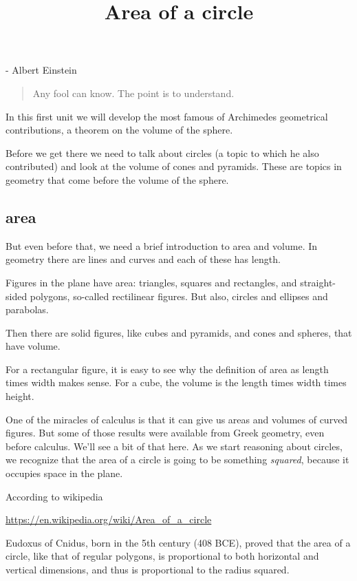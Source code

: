 \documentclass[11pt, oneside]{article}
\title{Area of a circle}
\date{}
\begin{document}
\maketitle
\Large  

- Albert Einstein

\begin{quote}Any fool can know.  The point is to understand.\end{quote}

In this first unit we will develop the most famous of Archimedes geometrical contributions, a theorem on the volume of the sphere.  

Before we get there we need to talk about circles (a topic to which he also contributed) and look at the volume of cones and pyramids.  These are topics in geometry that come  before the volume of the sphere.

\subsection*{area}

But even before that, we need a brief introduction to area and volume.  In geometry there are lines and curves and each of these has length.  

Figures in the plane have area:  triangles, squares and rectangles, and straight-sided polygons, so-called rectilinear figures.  But also, circles and ellipses and parabolas.  

Then there are solid figures, like cubes and pyramids, and cones and spheres, that have volume.

For a rectangular figure, it is easy to see why the definition of area as length times  width makes sense.  For a cube, the volume is the length times width times height.  

One of the miracles of calculus is that it can give us areas and volumes of curved figures.  But some of those results were available from Greek geometry, even before calculus.  We'll see a bit of that here.  As we start reasoning about circles, we recognize that the area of a circle is going to be something \emph{squared}, because it occupies space in the plane.

According to wikipedia

\url{https://en.wikipedia.org/wiki/Area_of_a_circle}

Eudoxus of Cnidus, born in the 5th century (408 BCE), proved that the area of a circle, like that of regular polygons, is proportional to both horizontal and vertical dimensions, and thus is proportional to the radius squared.
\end{document}
